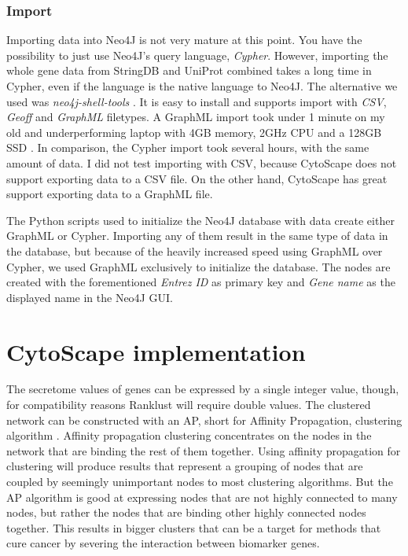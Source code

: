 \subsection{Import}
Importing data into Neo4J is not very mature at this point. You have the
possibility to just use Neo4J's query language, \textit{Cypher}. However,
importing the whole gene data from StringDB and UniProt combined takes a long
time in Cypher, even if the language is the native language to Neo4J. The
alternative we used was \textit{neo4j-shell-tools} \cite{neo4j-tools}. It is
easy to install and supports import with \textit{CSV}, \textit{Geoff} and
\textit{GraphML} filetypes. A GraphML import took under 1 minute on my old and
underperforming laptop with 4GB memory, 2GHz CPU and a 128GB SSD \cite{laptop}.
In comparison, the Cypher import took several hours, with the same amount of
data. I did not test importing with CSV, because CytoScape does not support
exporting data to a CSV file. On the other hand, CytoScape has great support
exporting data to a GraphML file.

The Python scripts used to initialize the Neo4J database with data create either
GraphML or Cypher. Importing any of them result in the same type of data in the
database, but because of the heavily increased speed using GraphML over Cypher,
we used GraphML exclusively to initialize the database. The nodes are created
with the forementioned \textit{Entrez ID} as primary key and \textit{Gene name}
as the displayed name in the Neo4J GUI.

\chapter{CytoScape implementation}
The secretome values of genes can be expressed by a single integer value,
though, for compatibility reasons Ranklust will require double values. The
clustered network can be constructed with an AP, short for Affinity Propagation,
clustering algorithm \cite{affinity-propagation}. Affinity propagation
clustering concentrates on the nodes in the network that are binding the rest of
them together. Using affinity propagation for clustering will produce results
that represent a grouping of nodes that are coupled by seemingly unimportant
nodes to most clustering algorithms. But the AP algorithm is good at expressing
nodes that are not highly connected to many nodes, but rather the nodes that are
binding other highly connected nodes together. This results in bigger clusters
that can be a target for methods that cure cancer by severing the interaction
between biomarker genes.

